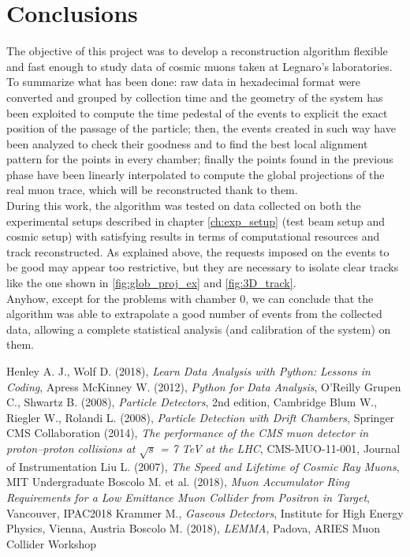 \documentclass[a4paper,11pt]{book}
\begin{document}
\chapter{Conclusions}
The objective of this project was to develop a reconstruction algorithm flexible and fast enough to study data of cosmic muons taken at Legnaro's laboratories. \\
To summarize what has been done: raw data in hexadecimal format were converted and grouped by collection time and the geometry of the system has been exploited to compute the time pedestal of the events to explicit the exact position of the passage of the particle; then, the events created in such way have been analyzed to check their goodness and to find the best local alignment pattern for the points in every chamber; finally the points found in the previous phase have been linearly interpolated to compute the global projections of the real muon trace, which will be reconstructed thank to them.\\
During this work, the algorithm was tested on data collected on both the experimental setups described in chapter \ref{ch:exp_setup} (test beam setup and cosmic setup) with satisfying results in terms of computational resources and track reconstructed. As explained above, the requests imposed on the events to be good may appear too restrictive, but they are necessary to isolate clear tracks like the one shown in \ref{fig:glob_proj_ex} and \ref{fig:3D_track}.\\
Anyhow, except for the problems with chamber 0, we can conclude that the algorithm was able to extrapolate a good number of events from the collected data, allowing a complete statistical analysis (and calibration of the system) on them.\\




\clearpage

\begin{thebibliography}{1}
 Henley A. J., Wolf D. (2018), \textit{Learn Data Analysis with Python: Lessons in Coding}, Apress 
 McKinney W. (2012), \textit{Python for Data Analysis}, O'Reilly 
 Grupen C., Shwartz B. (2008), \textit{Particle Detectors}, 2nd edition, Cambridge 
 Blum W., Riegler W., Rolandi L. (2008), \textit{Particle Detection with Drift Chambers}, Springer
 CMS Collaboration (2014), \textit{The performance of the CMS muon detector in proton–proton collisions at $\sqrt{s}$ = 7 TeV at the LHC}, CMS-MUO-11-001, Journal of Instrumentation
 Liu L. (2007), \textit{The Speed and Lifetime of Cosmic Ray Muons}, MIT Undergraduate
 Boscolo M. et al. (2018), \textit{Muon Accumulator Ring Requirements for a Low Emittance Muon Collider from Positron in Target}, Vancouver, IPAC2018
 Krammer M., \textit{Gaseous Detectors}, Institute for High Energy Physics, Vienna, Austria
 Boscolo M. (2018), \textit{LEMMA}, Padova, ARIES Muon Collider Workshop
\end{thebibliography}
\end{document}
